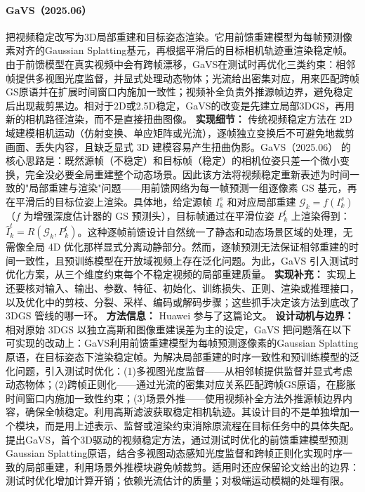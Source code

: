 \paragraph{GaVS（2025.06）\cite{2506_23957}}
把视频稳定改写为3D局部重建和目标姿态渲染。它用前馈重建模型为每帧预测像素对齐的Gaussian Splatting基元，再根据平滑后的目标相机轨迹重渲染稳定帧。由于前馈模型在真实视频中会有跨帧漂移，GaVS在测试时再优化三类约束：相邻帧提供多视图光度监督，并显式处理动态物体；光流给出密集对应，用来匹配跨帧GS原语并在扩展时间窗口内施加一致性；视频补全负责外推源帧边界，避免稳定后出现裁剪黑边。相对于2D或2.5D稳定，GaVS的改变是先建立局部3DGS，再用新的相机路径渲染，而不是直接扭曲图像。
\textbf{实现细节：} 传统视频稳定方法在 2D 域建模相机运动（仿射变换、单应矩阵或光流），逐帧独立变换后不可避免地裁剪画面、丢失内容，且缺乏显式 3D 建模容易产生扭曲伪影。GaVS（2025.06） 的核心思路是：既然源帧（不稳定）和目标帧（稳定）的相机位姿只差一个微小变换，完全没必要全局重建整个动态场景。因此该方法将视频稳定重新表述为时间一致的"局部重建与渲染"问题——用前馈网络为每一帧预测一组逐像素 GS 基元，再在平滑后的目标位姿上渲染。具体地，给定源帧 $I_k^s$ 和对应局部重建 $\mathcal{G}_k = f(I_k^s)$（$f$ 为增强深度估计器的 GS 预测头），目标帧通过在平滑位姿 $P_k^t$ 上渲染得到：$\hat{I}_k^t = R(\mathcal{G}_k, P_k^t)$。这种逐帧前馈设计自然统一了静态和动态场景区域的处理，无需像全局 4D 优化那样显式分离动静部分。然而，逐帧预测无法保证相邻重建的时间一致性，且预训练模型在开放域视频上存在泛化问题。为此，GaVS 引入测试时优化方案，从三个维度约束每个不稳定视频的局部重建质量。
\textbf{实现补充：} 实现上还要核对输入、输出、参数、特征、初始化、训练损失、正则、渲染或推理接口，以及优化中的剪枝、分裂、采样、编码或解码步骤；这些抓手决定该方法到底改了 3DGS 管线的哪一环。
\textbf{方法信息：} Huawei 参与了这篇论文。
\textbf{设计动机与边界：} 相对原始 3DGS 以独立高斯和图像重建误差为主的设定，GaVS 把问题落在以下可实现的改动上：GaVS利用前馈重建模型为每帧预测逐像素的Gaussian Splatting原语，在目标姿态下渲染稳定帧。为解决局部重建的时序一致性和预训练模型的泛化问题，引入测试时优化：(1)多视图光度监督——从相邻帧提供监督并显式考虑动态物体；(2)跨帧正则化——通过光流的密集对应关系匹配跨帧GS原语，在膨胀时间窗口内施加一致性约束；(3)场景外推——使用视频补全方法外推源帧边界内容，确保全帧稳定。利用高斯滤波获取稳定相机轨迹。其设计目的不是单独增加一个模块，而是用上述表示、监督或渲染约束消除原流程在目标任务中的具体失配。提出GaVS，首个3D驱动的视频稳定方法，通过测试时优化的前馈重建模型预测Gaussian Splatting原语，结合多视图动态感知光度监督和跨帧正则化实现时序一致的局部重建，利用场景外推模块避免帧裁剪。适用时还应保留论文给出的边界：测试时优化增加计算开销；依赖光流估计的质量；对极端运动模糊的处理有限。
